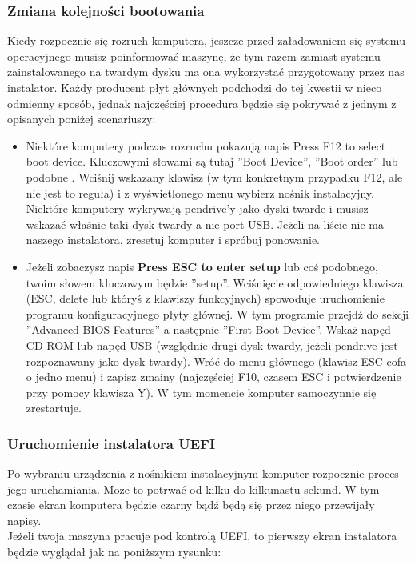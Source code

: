 \subsubsection{Zmiana kolejności bootowania}
Kiedy rozpocznie się rozruch komputera, jeszcze przed załadowaniem się systemu operacyjnego musisz poinformować maszynę, że tym razem  zamiast systemu zainstalowanego na twardym dysku ma ona wykorzystać przygotowany przez nas instalator. Każdy producent płyt głównych podchodzi do tej kwestii w nieco odmienny sposób, jednak najczęściej procedura będzie się pokrywać z jednym z opisanych poniżej scenariuszy:
\begin{itemize}
\item Niektóre komputery podczas rozruchu pokazują napis Press F12 to select boot device. Kluczowymi słowami są tutaj ”Boot Device”, ”Boot order” lub podobne . Wciśnij wskazany klawisz (w tym konkretnym przypadku F12, ale nie jest to reguła) i z wyświetlonego menu wybierz nośnik instalacyjny. Niektóre komputery wykrywają pendrive'y jako dyski twarde i musisz wskazać właśnie taki dysk twardy a nie port USB. Jeżeli na liście nie ma naszego instalatora, zresetuj komputer i spróbuj ponowanie.
\item Jeżeli zobaczysz napis \textbf{Press ESC to enter setup} lub coś podobnego, twoim słowem kluczowym będzie ”setup”. Wciśnięcie odpowiedniego klawisza (ESC, delete lub któryś z klawiszy funkcyjnych) spowoduje uruchomienie programu konfiguracyjnego płyty głównej. W tym programie przejdź do sekcji ”Advanced BIOS Features” a następnie ”First Boot Device”. Wskaż napęd CD-ROM lub napęd USB (względnie drugi dysk twardy, jeżeli pendrive jest rozpoznawany jako dysk twardy). Wróć do menu głównego (klawisz ESC cofa o jedno menu) i zapisz zmainy (najczęściej F10, czasem ESC i potwierdzenie przy pomocy klawisza Y). W tym momencie komputer samoczynnie się zrestartuje.
\end{itemize}
\subsubsection{Uruchomienie instalatora UEFI}
Po wybraniu urządzenia z nośnikiem instalacyjnym komputer rozpocznie proces jego uruchamiania. Może to potrwać od kilku do kilkunastu sekund. W tym czasie ekran komputera będzie czarny bądź będą się przez niego przewijały napisy.\\
Jeżeli twoja maszyna pracuje pod kontrolą UEFI, to pierwszy ekran instalatora będzie wyglądał jak na poniższym rysunku:

